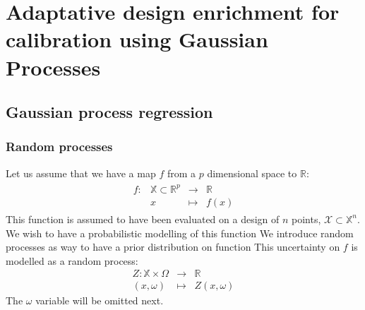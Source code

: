 \documentclass[../../Main_ManuscritThese.tex]{subfiles}
\begin{document}
\chapter{Adaptative design enrichment for calibration using Gaussian Processes}
\label{chap:adaptative_design_gp}
\minitoc
\newpage
\subfileLocal{\pagestyle{contentStyle}}





\section{Gaussian process regression}
\subsection{Random processes}
Let us assume that we have a map $f$ from a $p$ dimensional space to $\mathbb{R}$:
\begin{align}
  \begin{array}{rrcl}
    f: & \mathbb{X} \subset \mathbb{R}^p& \longrightarrow & \mathbb{R} \\
       & x & \longmapsto & f(x)
  \end{array}
\end{align}
This function is assumed to have been evaluated on a design of $n$ points, $\mathcal{X} \subset \mathbb{X}^n$. 
We wish to have a probabilistic modelling of this function
We introduce random processes as way to have a prior distribution on function
This uncertainty on $f$ is modelled as a random process:
\begin{equation}
  \begin{array}{rcl}
    Z: \mathbb{X} \times \Omega& \longrightarrow & \mathbb{R} \\
    (x,\omega) & \longmapsto & Z(x,\omega)
  \end{array}
\end{equation}
The $\omega$ variable will be omitted next.
\end{document}
